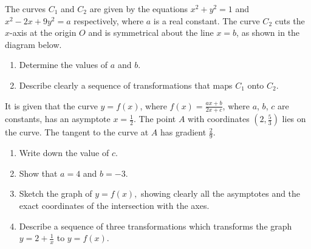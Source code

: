 \begin{problem}
    The curves $C_{1}$ and $C_{2}$ are given by the equations $x^{2}+y^{2}=1$ and $x^{2}-2x+9y^{2}=a$ respectively, where $a$ is a real constant. The curve $C_{2}$ cuts the $x$-axis at the origin $O$ and is symmetrical about the line $x=b$, as shown in the diagram below.

    \begin{figure}[H]
        \centering
        \caption{}
    \end{figure}

    \begin{enumerate}
        \item Determine the values of $a$ and $b$.
        \item Describe clearly a sequence of transformations that maps $C_{1}$ onto $C_{2}$.
    \end{enumerate}
\end{problem}

\begin{problem}
    It is given that the curve $y = f(x)$, where $f(x) = \frac{ax + b}{2x + c}$, where $a$, $b$, $c$ are constants, has an asymptote $x=\frac{1}{2}.$ The point $A$ with coordinates $(2, \frac53)$ lies on the curve. The tangent to the curve at $A$ has gradient $\frac29$.

    \begin{enumerate}
        \item Write down the value of $c$.
        \item Show that $a=4$ and $b=-3$.
        \item Sketch the graph of $y=f(x),$ showing clearly all the asymptotes and the exact coordinates of the intersection with the axes.
        \item Describe a sequence of three transformations which transforms the graph $y = 2 + \frac1x$ to $y = f(x)$.
    \end{enumerate}
\end{problem}

